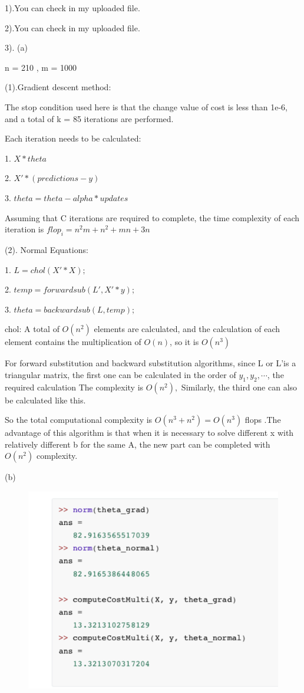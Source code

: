 \documentclass[english,onecolumn]{IEEEtran}
\begin{document}
1).You can check in my uploaded  file.

2).You can check in my uploaded  file.

3). (a)

n = 210 , m = 1000

(1).Gradient descent method:

The stop condition used here is that the change value of cost is less than 1e-6, and a total of k = 85 iterations are performed.

Each iteration needs to be calculated:

1. $X*theta$

2. $X' * (predictions - y)$

3. $theta = theta - alpha * updates$

Assuming that C iterations are required to complete, the time complexity of each iteration is $f l o p_{i}=n^{2} m+n^{2}+m n+3 n$ 

(2). Normal Equations:

1. $L = chol(X' * X);$

2. $temp = forwardsub(L',X'*y);$

3. $theta = backwardsub(L,temp);$

chol: A total of $O\left(n^{2}\right)$ elements are calculated, and the calculation of each element contains the multiplication of $O(n)$, so it is $O\left(n^{ 3}\right)$

 For forward substitution and backward substitution algorithms, since L or L'is a triangular matrix, the first one can be calculated in the order of $y_{1}, y_{2}, \cdots$, the required calculation The complexity is $O\left(n^{2}\right),$ Similarly, the third one can also be calculated like this.

So the total computational complexity is $O\left(n^{3}+n^{2}\right)=O\left(n^{3}\right)$ flops .The advantage of this algorithm is that when it is necessary to solve different x with relatively different b for the same A, the new part can be completed with $O\left(n^{2}\right)$ complexity.

(b)
\begin{figure}[!htb]
	\centering
	\includegraphics[scale=0.35]{norm.png}
\end{figure}
\end{document}
